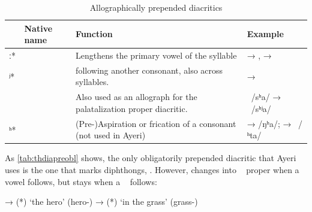 
\begin{table}[tp]
\caption{Allographically prepended diacritics}
\begin{tabu} to 
\toprule
\tableheaderfont

	& Native name
	& Function
	& Example
	\\
	
\toprule

ː*
	& 
	& Lengthens the primary vowel of the syllable
	&  → ,\newline
		 → 
	\\
	
\midrule

ʲ*
	& 
	&  following another consonant, also across syllables.
	&  → 
	\\
	
	
	& 
	& Also used as an allograph for the palatalization proper diacritic.
	& ~/sʰa/ → ~/sʰʲa/
	\\
	
\midrule

ʰ*
	& 
	& (Pre-)Aspiration or frication of a consonant (not used in Ayeri)
	&  →  /ŋʰa/;\newline
		 → ~/ʰta/
	\\

\bottomrule
\end{tabu}
\label{tab:thdiapreallo}
\end{table}

As \autoref{tab:thdiapreobl} shows, the only obligatorily prepended diacritic
that Ayeri uses is the one that marks diphthongs, .
However,  changes into ~ proper when a vowel follows,
but stays  when a ~ follows:

\pex
	\a {} → 
		 (*) 
		`the hero' (hero-\Aarg{})
	\a {} → 
		 (*)  `in 
		the grass' (grass-\Loc{})
\xe

